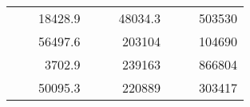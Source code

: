 \begin{table}[]
\begin{tabular}{|ccrccrccr}
\rowcolor[HTML]{DDFDFF} 
\multicolumn{1}{|c|}{\cellcolor[HTML]{FFFFC7}}                                & \multicolumn{1}{c|}{\cellcolor[HTML]{DDFDFF}}                      & \multicolumn{1}{r|}{\cellcolor[HTML]{DAE8FC}18428.9}   & \multicolumn{1}{c|}{\cellcolor[HTML]{FFFFC7}}                                & \multicolumn{1}{c|}{\cellcolor[HTML]{DDFDFF}}                       & \multicolumn{1}{r|}{\cellcolor[HTML]{DDFDFF}48034.3}   & \multicolumn{1}{c|}{\cellcolor[HTML]{FFFFC7}}                                & \multicolumn{1}{c|}{\cellcolor[HTML]{DDFDFF}}                      & \multicolumn{1}{r|}{\cellcolor[HTML]{DDFDFF}503530}    \\ \cline{3-3} \cline{6-6} \cline{9-9} 
\multicolumn{1}{|c|}{\cellcolor[HTML]{FFFFC7}}                                & \multicolumn{1}{c|}{\cellcolor[HTML]{DDFDFF}}                      & \multicolumn{1}{r|}{\cellcolor[HTML]{DDFDFF}56497.6}   & \multicolumn{1}{c|}{\cellcolor[HTML]{FFFFC7}}                                & \multicolumn{1}{c|}{\cellcolor[HTML]{DDFDFF}}                       & \multicolumn{1}{r|}{\cellcolor[HTML]{DAE8FC}203104}    & \multicolumn{1}{c|}{\cellcolor[HTML]{FFFFC7}}                                & \multicolumn{1}{c|}{\cellcolor[HTML]{DDFDFF}}                      & \multicolumn{1}{r|}{\cellcolor[HTML]{DAE8FC}104690}    \\ \cline{3-3} \cline{6-6} \cline{9-9} 
\rowcolor[HTML]{DDFDFF} 
\multicolumn{1}{|c|}{\cellcolor[HTML]{FFFFC7}}                                & \multicolumn{1}{c|}{\cellcolor[HTML]{DDFDFF}}                      & \multicolumn{1}{r|}{\cellcolor[HTML]{DAE8FC}3702.9}    & \multicolumn{1}{c|}{\cellcolor[HTML]{FFFFC7}}                                & \multicolumn{1}{c|}{\cellcolor[HTML]{DDFDFF}}                       & \multicolumn{1}{r|}{\cellcolor[HTML]{DDFDFF}239163}    & \multicolumn{1}{c|}{\cellcolor[HTML]{FFFFC7}}                                & \multicolumn{1}{c|}{\cellcolor[HTML]{DDFDFF}}                      & \multicolumn{1}{r|}{\cellcolor[HTML]{DDFDFF}866804}    \\ \cline{3-3} \cline{6-6} \cline{9-9} 
\multicolumn{1}{|c|}{\cellcolor[HTML]{FFFFC7}}                                & \multicolumn{1}{c|}{\cellcolor[HTML]{DDFDFF}}                      & \multicolumn{1}{r|}{\cellcolor[HTML]{DDFDFF}50095.3}   & \multicolumn{1}{c|}{\cellcolor[HTML]{FFFFC7}}                                & \multicolumn{1}{c|}{\cellcolor[HTML]{DDFDFF}}                       & \multicolumn{1}{r|}{\cellcolor[HTML]{DAE8FC}220889}    & \multicolumn{1}{c|}{\cellcolor[HTML]{FFFFC7}}                                & \multicolumn{1}{c|}{\cellcolor[HTML]{DDFDFF}}                      & \multicolumn{1}{r|}{\cellcolor[HTML]{DAE8FC}303417}    \\ \cline{3-3} \cline{6-6} \cline{9-9} 

\end{tabular}
\end{table}
